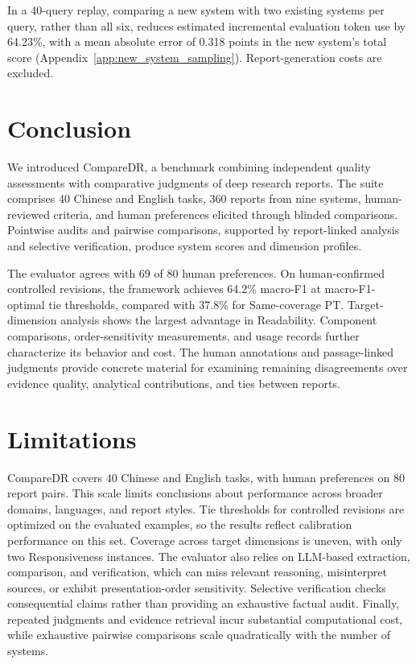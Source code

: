 \documentclass{article}
\begin{document}
\par In a 40-query replay, comparing a new system with two existing systems per query, rather than all six, reduces estimated incremental evaluation token use by 64.23\%, with a mean absolute error of 0.318 points in the new system's total score (Appendix~\ref{app:new_system_sampling}). Report-generation costs are excluded.\par \section{Conclusion}
\label{sec:conclusion}
We introduced CompareDR, a benchmark combining independent quality assessments with comparative judgments of deep research reports. The suite comprises 40 Chinese and English tasks, 360 reports from nine systems, human-reviewed criteria, and human preferences elicited through blinded comparisons. Pointwise audits and pairwise comparisons, supported by report-linked analysis and selective verification, produce system scores and dimension profiles.

The evaluator agrees with 69 of 80 human preferences. On human-confirmed controlled revisions, the framework achieves 64.2\% macro-F1 at macro-F1-optimal tie thresholds, compared with 37.8\% for Same-coverage PT. Target-dimension analysis shows the largest advantage in Readability. Component comparisons, order-sensitivity measurements, and usage records further characterize its behavior and cost. The human annotations and passage-linked judgments provide concrete material for examining remaining disagreements over evidence quality, analytical contributions, and ties between reports.


\section*{Limitations}
CompareDR covers 40 Chinese and English tasks, with human preferences on 80 report pairs. This scale limits conclusions about performance across broader domains, languages, and report styles. Tie thresholds for controlled revisions are optimized on the evaluated examples, so the results reflect calibration performance on this set. Coverage across target dimensions is uneven, with only two Responsiveness instances. The evaluator also relies on LLM-based extraction, comparison, and verification, which can miss relevant reasoning, misinterpret sources, or exhibit presentation-order sensitivity. Selective verification checks consequential claims rather than providing an exhaustive factual audit. Finally, repeated judgments and evidence retrieval incur substantial computational cost, while exhaustive pairwise comparisons scale quadratically with the number of systems.
\clearpage


\end{document}
